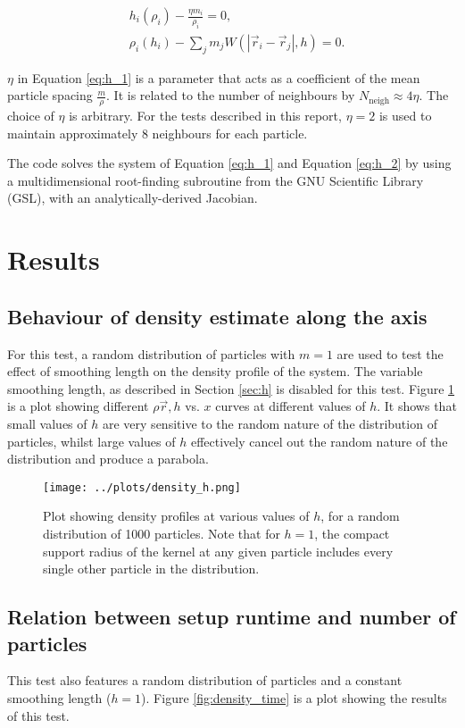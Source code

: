 \documentclass[onecolumn,12pt]{article}
\begin{document}
\begin{align}
    &h_i(\rho_i) - \frac{\eta m_i}{\rho_i} = 0, \label{eq:h_1}\\
    &\rho_i(h_i) - \sum\limits_j m_j W(|\vec{r}_i - \vec{r}_j|, h) = 0. \label{eq:h_2}
\end{align}

$\eta$ in Equation \ref{eq:h_1} is a parameter that acts as a coefficient of the mean particle spacing $\frac{m}{\rho}$. It is related to the number of neighbours by $N_\textrm{neigh} \approx 4\eta$. The choice of $\eta$ is arbitrary. For the tests described in this report, $\eta = 2$ is used to maintain approximately 8 neighbours for each particle.


The code solves the system of Equation \ref{eq:h_1} and Equation \ref{eq:h_2} by using a multidimensional root-finding subroutine from the GNU Scientific Library (GSL), with an analytically-derived Jacobian.

\section{Results}

\subsection{Behaviour of density estimate along the axis}
For this test, a random distribution of particles with $m = 1$ are used to test the effect of smoothing length on the density profile of the system. The variable smoothing length, as described in Section \ref{sec:h} is disabled for this test. Figure \ref{fig:density_h} is a plot showing different $\rho{\vec{r}, h}$ vs. $x$ curves at different values of $h$. It shows that small values of $h$ are very sensitive to the random nature of the distribution of particles, whilst large values of $h$ effectively cancel out the random nature of the distribution and produce a parabola.

\begin{figure}[h]
    \centering
    \texttt{[image: ../plots/density\_h.png]}
    \caption{Plot showing density profiles at various values of $h$, for a random distribution of 1000 particles. Note that for $h = 1$, the compact support radius of the kernel at any given particle includes every single other particle in the distribution.}
    \label{fig:density_h}
\end{figure}

\subsection{Relation between setup runtime and number of particles}
This test also features a random distribution of particles and a constant smoothing length ($h = 1$). Figure \ref{fig:density_time} is a plot showing the results of this test. 
\end{document}
